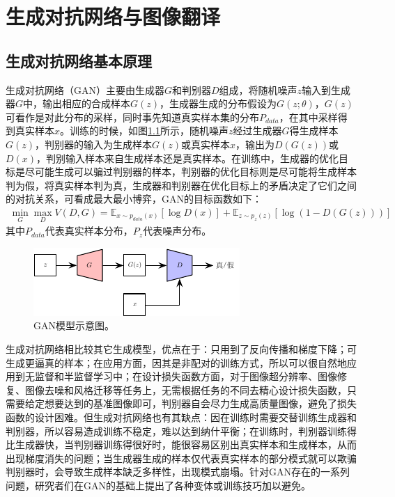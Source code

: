 \chapter{生成对抗网络与图像翻译}

\section{生成对抗网络基本原理}

生成对抗网络（GAN\cite{goodfellow2014generative}）主要由生成器$G$和判别器$D$组成，将随机噪声$z$输入到生成器$G$中，输出相应的合成样本$G(z)$，生成器生成的分布假设为$G(z;\theta)$，$G(z)$可看作是对此分布的采样，同时事先知道真实样本集的分布$P_{data}$，在其中采样得到真实样本$x$。训练的时候，如图\ref{GAN}所示，随机噪声$z$经过生成器$G$得生成样本$G(z)$，判别器的输入为生成样本$G(z)$或真实样本$x$，输出为$D(G(z))$或$D(x)$，判别输入样本来自生成样本还是真实样本。在训练中，生成器的优化目标是尽可能生成可以骗过判别器的样本，判别器的优化目标则是尽可能将生成样本判为假，将真实样本判为真，生成器和判别器在优化目标上的矛盾决定了它们之间的对抗关系，可看成最大最小博弈，GAN的目标函数如下：
\begin{equation}
\begin{split}
\min \limits_{G} \max \limits_{D} V(D,G) = \mathbb{E}_{x\sim p_{data}(x)}[\log D(x)] + \mathbb{E}_{z\sim p_z(z)}[\log(1 - D(G(z)))]
\end{split}
\label{eq:GAN}
\end{equation}
其中$P_{data}$代表真实样本分布，$P_z$代表噪声分布。

\begin{figure}[ht]
    \centering
	\includegraphics[width=.8\textwidth]{figs/GAN.pdf}
	\caption{GAN模型示意图\cite{goodfellow2014generative}。}
	\label{GAN}
\end{figure}

生成对抗网络相比较其它生成模型，优点在于：只用到了反向传播和梯度下降；可生成更逼真的样本；在应用方面，因其是非配对的训练方式，所以可以很自然地应用到无监督和半监督学习中；在设计损失函数方面，对于图像超分辨率、图像修复、图像去噪和风格迁移等任务上，无需根据任务的不同去精心设计损失函数，只需要给定想要达到的基准图像即可，判别器自会尽力生成高质量图像，避免了损失函数的设计困难。但生成对抗网络也有其缺点：因在训练时需要交替训练生成器和判别器，所以容易造成训练不稳定，难以达到纳什平衡；在训练时，判别器训练得比生成器快，当判别器训练得很好时，能很容易区别出真实样本和生成样本，从而出现梯度消失的问题；当生成器生成的样本仅代表真实样本的部分模式就可以欺骗判别器时，会导致生成样本缺乏多样性，出现模式崩塌。针对GAN存在的一系列问题，研究者们在GAN的基础上提出了各种变体或训练技巧加以避免。

